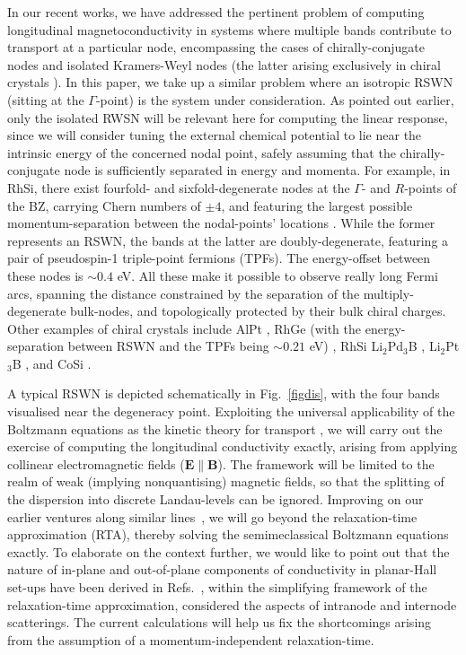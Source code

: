 \documentclass[aps,prb,onecolumn,nofootinbib,citeautoscript,10pt, showkeys]{revtex4-2}
\begin{document}
In our recent works, we have addressed the pertinent problem of computing longitudinal magnetoconductivity in systems where multiple bands contribute to transport at a particular node, encompassing the cases of chirally-conjugate nodes
\cite{ips-exact-spin1} and isolated Kramers-Weyl nodes \cite{ips-exact-kwn} (the latter arising exclusively in chiral crystals \cite{hasan-review, long-ksm}). In this paper, we take up a similar problem where an isotropic RSWN (sitting at the $\Gamma$-point) is the system under consideration. As pointed out earlier, only the isolated RWSN will be relevant here for computing the linear response, since we will consider tuning the external chemical potential to lie near the intrinsic energy of the concerned nodal point, safely assuming that the chirally-conjugate node is sufficiently separated in energy and momenta. For example, in RhSi, there exist fourfold- and sixfold-degenerate nodes at the $\Gamma$- and $R$-points of the BZ, carrying Chern numbers of $\pm 4$, and featuring the largest possible momentum-separation between the nodal-points' locations \cite{sanchez, multifold-rhsi}. While the former represents an RSWN, the bands at the latter are doubly-degenerate, featuring a pair of pseudospin-1 triple-point fermions (TPFs). The energy-offset between these nodes is $\sim 0.4 $ eV. All these make it possible to observe really long Fermi arcs, spanning the distance constrained by the separation of the multiply-degenerate bulk-nodes, and topologically protected by their bulk chiral charges.
Other examples of chiral crystals include AlPt \cite{schroter}, RhGe (with the energy-separation between RSWN and the TPFs being $\sim 0.21 $ eV) \cite{bahadur-RhGe}, RhSi \cite{sanchez} Li$_2$Pd$_3$B \cite{law-LiPdB}, Li$_2$Pt$_3$B \cite{law-LiPdB}, and CoSi \cite{sanchez, tang2017_multiple}.


A typical RSWN is depicted schematically in Fig.~\ref{figdis}, with the four bands visualised near the degeneracy point. Exploiting the universal applicability of the Boltzmann equations as the kinetic theory for transport \cite{mermin, ips-kush-review}, we will carry out the exercise of computing the longitudinal conductivity exactly, arising from applying collinear electromagnetic fields ($\boldsymbol   E  \parallel \boldsymbol B $). The framework will be limited to the realm of weak (implying nonquantising) magnetic fields, so that the splitting of the dispersion into discrete Landau-levels can be ignored. Improving on our earlier ventures along similar lines~\cite{ips-rsw-ph, ips-internode}, we will go beyond the relaxation-time approximation (RTA), thereby solving the semimeclassical Boltzmann equations exactly. To elaborate on the context further, we would like to point out that the nature of in-plane and out-of-plane components of conductivity in planar-Hall set-ups have been derived in Refs.~\cite{ips-rsw-ph, ips-internode}, within the simplifying framework of the relaxation-time approximation, considered the aspects of intranode \cite{ips-rsw-ph} and internode \cite{ips-internode} scatterings. The current calculations will help us fix the shortcomings arising from the assumption of a momentum-independent relaxation-time.
\end{document}
